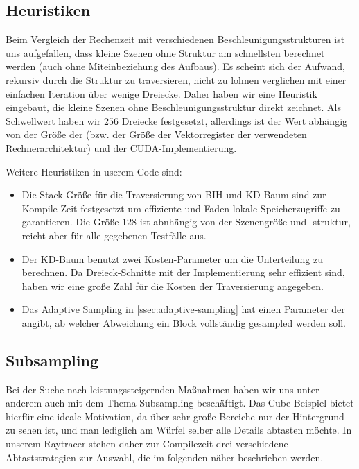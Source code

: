 \subsection{Heuristiken}

Beim Vergleich der Rechenzeit mit verschiedenen Beschleunigungsstrukturen ist uns aufgefallen, dass kleine Szenen ohne Struktur am schnellsten berechnet werden (auch ohne Miteinbeziehung des Aufbaus). Es scheint sich der Aufwand, rekursiv durch die Struktur zu traversieren, nicht zu lohnen verglichen mit einer einfachen Iteration über wenige Dreiecke. Daher haben wir eine Heuristik eingebaut, die kleine Szenen ohne Beschleunigungsstruktur direkt zeichnet. Als Schwellwert haben wir $256$ Dreiecke festgesetzt, allerdings ist der Wert abhängig von der Größe der  (bzw. der Größe der Vektorregister der verwendeten Rechnerarchitektur) und der CUDA-Implementierung.

Weitere Heuristiken in userem Code sind:

\begin{itemize}
\item Die Stack-Größe für die Traversierung von BIH und KD-Baum sind zur Kompile-Zeit festgesetzt um effiziente und Faden-lokale Speicherzugriffe zu garantieren. Die Größe $128$ ist abnhängig von der Szenengröße und -struktur, reicht aber für alle gegebenen Testfälle aus.
\item Der KD-Baum benutzt zwei Kosten-Parameter um die Unterteilung zu berechnen. Da Dreieck-Schnitte mit der  Implementierung sehr effizient sind, haben wir eine große Zahl für die Kosten der Traversierung angegeben.
\item Das Adaptive Sampling in \ref{ssec:adaptive-sampling} hat einen Parameter der angibt, ab welcher Abweichung ein Block vollständig gesampled werden soll.
\end{itemize}

\subsection{Subsampling}
Bei der Suche nach leistungssteigernden Maßnahmen haben wir uns unter anderem auch mit dem Thema Subsampling beschäftigt.
Das Cube-Beispiel bietet hierfür eine ideale Motivation, da über sehr große Bereiche nur der Hintergrund zu sehen ist, und man lediglich am Würfel selber alle Details abtasten möchte.
In unserem Raytracer stehen daher zur Compilezeit drei verschiedene Abtaststrategien zur Auswahl, die im folgenden näher beschrieben werden.

